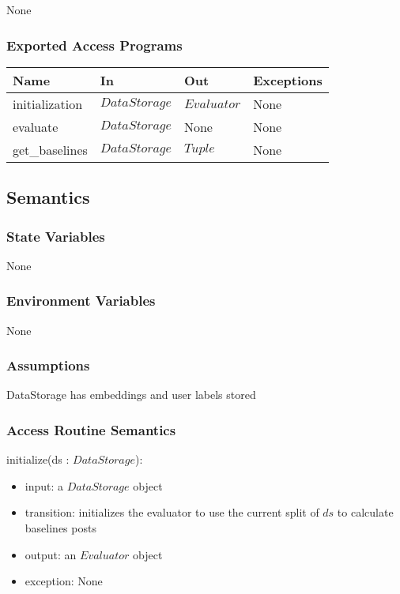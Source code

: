 \documentclass[12pt, titlepage]{article}
\begin{document}
None

\subsubsection{Exported Access Programs}

\begin{center}
\begin{tabular}{p{3cm} p{5cm} p{3cm} p{3cm}}
\hline
\textbf{Name} & \textbf{In} & \textbf{Out} & \textbf{Exceptions} \\
\hline
initialization & $DataStorage$ & $Evaluator$ & None \\
evaluate & $DataStorage$ & None & None \\
get\_baselines & $DataStorage$ & $Tuple$ & None \\
\hline
\end{tabular}
\end{center}

\subsection{Semantics}

\subsubsection{State Variables}

None

\subsubsection{Environment Variables}

None

\subsubsection{Assumptions}

DataStorage has embeddings and user labels stored

\subsubsection{Access Routine Semantics}

\noindent initialize(ds : $DataStorage$):
\begin{itemize}
\item input: a $DataStorage$ object
\item transition: initializes the evaluator to use the current split of $ds$ to calculate baselines posts
\item output: an $Evaluator$ object
\item exception: None
\end{itemize}
\end{document}
